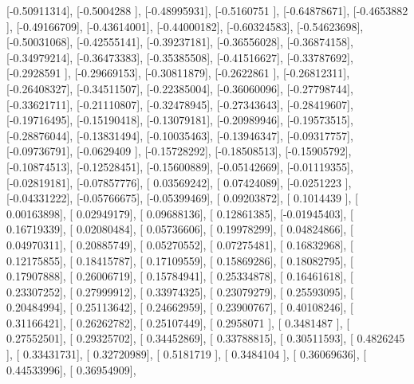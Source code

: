 \documentclass{article}
\begin{document}
       [-0.50911314],
       [-0.5004288 ],
       [-0.48995931],
       [-0.5160751 ],
       [-0.64878671],
       [-0.4653882 ],
       [-0.49166709],
       [-0.43614001],
       [-0.44000182],
       [-0.60324583],
       [-0.54623698],
       [-0.50031068],
       [-0.42555141],
       [-0.39237181],
       [-0.36556028],
       [-0.36874158],
       [-0.34979214],
       [-0.36473383],
       [-0.35385508],
       [-0.41516627],
       [-0.33787692],
       [-0.2928591 ],
       [-0.29669153],
       [-0.30811879],
       [-0.2622861 ],
       [-0.26812311],
       [-0.26408327],
       [-0.34511507],
       [-0.22385004],
       [-0.36060096],
       [-0.27798744],
       [-0.33621711],
       [-0.21110807],
       [-0.32478945],
       [-0.27343643],
       [-0.28419607],
       [-0.19716495],
       [-0.15190418],
       [-0.13079181],
       [-0.20989946],
       [-0.19573515],
       [-0.28876044],
       [-0.13831494],
       [-0.10035463],
       [-0.13946347],
       [-0.09317757],
       [-0.09736791],
       [-0.0629409 ],
       [-0.15728292],
       [-0.18508513],
       [-0.15905792],
       [-0.10874513],
       [-0.12528451],
       [-0.15600889],
       [-0.05142669],
       [-0.01119355],
       [-0.02819181],
       [-0.07857776],
       [ 0.03569242],
       [ 0.07424089],
       [-0.0251223 ],
       [-0.04331222],
       [-0.05766675],
       [-0.05399469],
       [ 0.09203872],
       [ 0.1014439 ],
       [ 0.00163898],
       [ 0.02949179],
       [ 0.09688136],
       [ 0.12861385],
       [-0.01945403],
       [ 0.16719339],
       [ 0.02080484],
       [ 0.05736606],
       [ 0.19978299],
       [ 0.04824866],
       [ 0.04970311],
       [ 0.20885749],
       [ 0.05270552],
       [ 0.07275481],
       [ 0.16832968],
       [ 0.12175855],
       [ 0.18415787],
       [ 0.17109559],
       [ 0.15869286],
       [ 0.18082795],
       [ 0.17907888],
       [ 0.26006719],
       [ 0.15784941],
       [ 0.25334878],
       [ 0.16461618],
       [ 0.23307252],
       [ 0.27999912],
       [ 0.33974325],
       [ 0.23079279],
       [ 0.25593095],
       [ 0.20484994],
       [ 0.25113642],
       [ 0.24662959],
       [ 0.23900767],
       [ 0.40108246],
       [ 0.31166421],
       [ 0.26262782],
       [ 0.25107449],
       [ 0.2958071 ],
       [ 0.3481487 ],
       [ 0.27552501],
       [ 0.29325702],
       [ 0.34452869],
       [ 0.33788815],
       [ 0.30511593],
       [ 0.4826245 ],
       [ 0.33431731],
       [ 0.32720989],
       [ 0.5181719 ],
       [ 0.3484104 ],
       [ 0.36069636],
       [ 0.44533996],
       [ 0.36954909],
\end{document}
